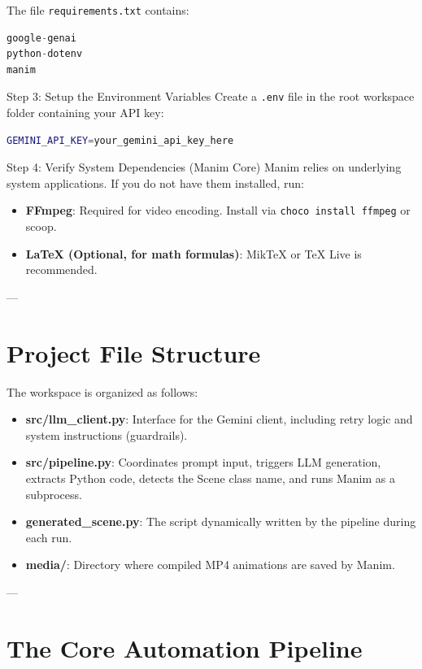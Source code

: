 \documentclass[11pt,a4paper]{article}
\begin{document}
The file \texttt{requirements.txt} contains:
\begin{lstlisting}[language=Python]
google-genai
python-dotenv
manim
\end{lstlisting}

\begin{setupbox}{Step 3: Setup the Environment Variables}
Create a \texttt{.env} file in the root workspace folder containing your API key:
\begin{lstlisting}[language=bash]
GEMINI_API_KEY=your_gemini_api_key_here
\end{lstlisting}
\end{setupbox}

\begin{setupbox}{Step 4: Verify System Dependencies (Manim Core)}
Manim relies on underlying system applications. If you do not have them installed, run:
\begin{itemize}
    \item \textbf{FFmpeg}: Required for video encoding. Install via \texttt{choco install ffmpeg} or scoop.
    \item \textbf{LaTeX (Optional, for math formulas)}: MikTeX or TeX Live is recommended.
\end{itemize}
\end{setupbox}

---

\section{Project File Structure}
The workspace is organized as follows:
\begin{itemize}[label=\(\bullet\)]
    \item \textbf{src/llm\_client.py}: Interface for the Gemini client, including retry logic and system instructions (guardrails).
    \item \textbf{src/pipeline.py}: Coordinates prompt input, triggers LLM generation, extracts Python code, detects the Scene class name, and runs Manim as a subprocess.
    \item \textbf{generated\_scene.py}: The script dynamically written by the pipeline during each run.
    \item \textbf{media/}: Directory where compiled MP4 animations are saved by Manim.
\end{itemize}

---

\section{The Core Automation Pipeline}
\end{document}
